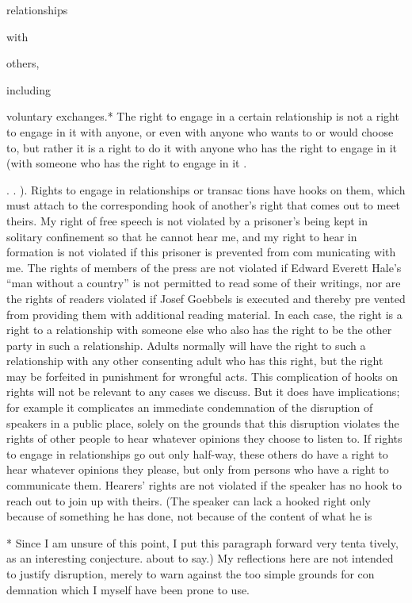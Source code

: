 \documentclass[11pt,openany]{book}
\begin{document}
relationships 

with 

others, 

including 

voluntary exchanges.* The right to engage in a certain relationship is not a right to engage in it with anyone, or even with anyone who wants to or would choose to, but rather it is a right to do it with anyone who has the right to engage in it (with someone who has the right to engage in it . 

. . ). Rights to engage in relationships or transac tions have hooks on them, which must attach to the corresponding hook of another's right that comes out to meet theirs. My right of free speech is not violated by a prisoner's being kept in solitary confinement so that he cannot hear me, and my right to hear in formation is not violated if this prisoner is prevented from com municating with me. The rights of members of the press are not violated if Edward Everett Hale's ``man without a country'' is not permitted to read some of their writings, nor are the rights of readers violated if Josef Goebbels is executed and thereby pre vented from providing them with additional reading material. In each case, the right is a right to a relationship with someone else who also has the right to be the other party in such a relationship. Adults normally will have the right to such a relationship with any other consenting adult who has this right, but the right may be forfeited in punishment for wrongful acts. This complication of hooks on rights will not be relevant to any cases we discuss. But it does have implications; for example it complicates an immediate condemnation of the disruption of speakers in a public place, solely on the grounds that this disruption violates the rights of other people to hear whatever opinions they choose to listen to. If rights to engage in relationships go out only half-way, these others do have a right to hear whatever opinions they please, but only from persons who have a right to communicate them. Hearers' rights are not violated if the speaker has no hook to reach out to join up with theirs. (The speaker can lack a hooked right only because of something he has done, not because of the content of what he is 

* Since I am unsure of this point, I put this paragraph forward very tenta tively, as an interesting conjecture. about to say.) My reflections here are not intended to justify disruption, merely to warn against the too simple grounds for con demnation which I myself have been prone to use. 
\end{document}
